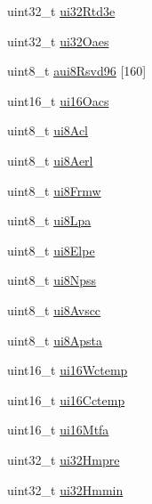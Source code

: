 \begin{DoxyCompactItemize}
\item 
uint32\+\_\+t \mbox{\hyperlink{struct__ni__nvme__identify_a46ebac32f0fcdf6d7caa62ff81c3ccee}{ui32\+Rtd3e}}
\item 
uint32\+\_\+t \mbox{\hyperlink{struct__ni__nvme__identify_a8eb441c540b1d0655fd836ec9a17b7a9}{ui32\+Oaes}}
\item 
uint8\+\_\+t \mbox{\hyperlink{struct__ni__nvme__identify_aeaf4efebb832aa52a3488c70d99cbad7}{aui8\+Rsvd96}} \mbox{[}160\mbox{]}
\item 
uint16\+\_\+t \mbox{\hyperlink{struct__ni__nvme__identify_a0ce8f4f305a7fcafb3e566cfe10bf2ef}{ui16\+Oacs}}
\item 
uint8\+\_\+t \mbox{\hyperlink{struct__ni__nvme__identify_a9a8466239709c38c4ea261ae9cc1bf14}{ui8\+Acl}}
\item 
uint8\+\_\+t \mbox{\hyperlink{struct__ni__nvme__identify_ac407aa1c810035f03a5dddf8c6862ca6}{ui8\+Aerl}}
\item 
uint8\+\_\+t \mbox{\hyperlink{struct__ni__nvme__identify_a69ebc8c5fb760e1d45c3db6a21628d5c}{ui8\+Frmw}}
\item 
uint8\+\_\+t \mbox{\hyperlink{struct__ni__nvme__identify_a0d36e31eec94219a862cbf00338e34a7}{ui8\+Lpa}}
\item 
uint8\+\_\+t \mbox{\hyperlink{struct__ni__nvme__identify_a4b03ce8a2a1862540228df324776cda8}{ui8\+Elpe}}
\item 
uint8\+\_\+t \mbox{\hyperlink{struct__ni__nvme__identify_a3128498b8b450e575f67a7630b700e4f}{ui8\+Npss}}
\item 
uint8\+\_\+t \mbox{\hyperlink{struct__ni__nvme__identify_aad035ab0a5cec66b1caaee6e413bf760}{ui8\+Avscc}}
\item 
uint8\+\_\+t \mbox{\hyperlink{struct__ni__nvme__identify_a390d79d78effd7801a9e4d0ad80d1ccd}{ui8\+Apsta}}
\item 
uint16\+\_\+t \mbox{\hyperlink{struct__ni__nvme__identify_a9935ebd3b9b3f24db3fdff534fad0706}{ui16\+Wctemp}}
\item 
uint16\+\_\+t \mbox{\hyperlink{struct__ni__nvme__identify_a78dcc2ecd5bba54e70a2d985b82785f0}{ui16\+Cctemp}}
\item 
uint16\+\_\+t \mbox{\hyperlink{struct__ni__nvme__identify_a36215df4cb766fba4a4d1e2a2eac415b}{ui16\+Mtfa}}
\item 
uint32\+\_\+t \mbox{\hyperlink{struct__ni__nvme__identify_a9fccf2f331bf06bfe8f28f5cb8e85914}{ui32\+Hmpre}}
\item 
uint32\+\_\+t \mbox{\hyperlink{struct__ni__nvme__identify_a6402ad1307d1f414d4d414028d407c62}{ui32\+Hmmin}}

\end{DoxyCompactItemize}
